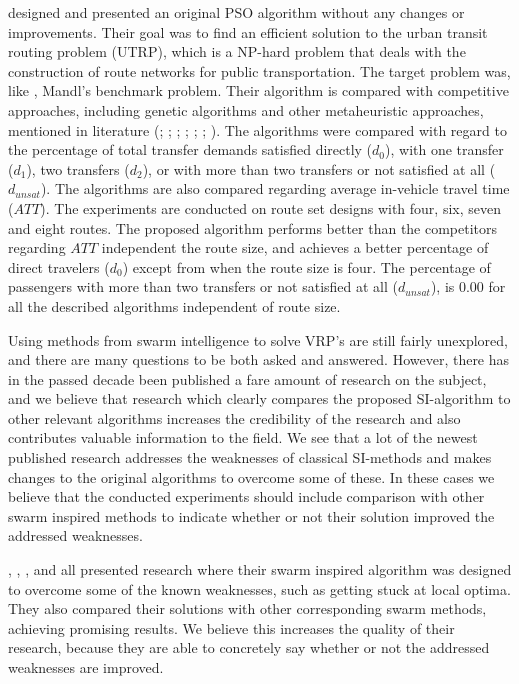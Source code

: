 \citet{kechagiopoulos14} designed and presented an original PSO algorithm without any changes or improvements. Their goal was to find an efficient solution to the urban transit routing problem (UTRP), which is a NP-hard problem that deals with the construction of route networks for public transportation. The target problem was, like \citet{nikolic14}, Mandl's benchmark problem. Their algorithm is compared with competitive approaches, including genetic algorithms and other metaheuristic approaches, mentioned in literature (\citet{baaj91}; \citet{chakroborty02}; \citet{kidwai98}; \citet{fan10}; \citet{fan09-2}; \citet{zhang10}; \citet{chew12}). The algorithms were compared with regard to the percentage of total transfer demands satisfied directly ($d_0$), with one transfer ($d_1$), two transfers ($d_2$), or with more than two transfers or not satisfied at all ($d_{unsat}$). The algorithms are also compared regarding average in-vehicle travel time ($ATT$). The experiments are conducted on route set designs with four, six, seven and eight routes. The proposed algorithm performs better than the competitors regarding $ATT$ independent the route size, and achieves a better percentage of direct travelers ($d_0$) except from when the route size is four. The percentage of passengers with more than two transfers or not satisfied at all ($d_{unsat}$), is $0.00$ for all the described algorithms independent of route size.  \newline

Using methods from swarm intelligence to solve VRP's are still fairly unexplored, and there are many questions to be both asked and answered. However, there has in the passed decade been published a fare amount of research on the subject, and we believe that research which clearly compares the proposed SI-algorithm to other relevant algorithms increases the credibility of the research and also contributes valuable information to the field. We see that a lot of the newest published research addresses the weaknesses of classical SI-methods and makes changes to the original algorithms to overcome some of these. In these cases we believe that the conducted experiments should include comparison with other swarm inspired methods to indicate whether or not their solution improved the addressed weaknesses. 

\citet{tripathi09}, \citet{yang07}, \citet{salehinejad10}, and \citet{jiang10} all presented research where their swarm inspired algorithm was designed to overcome some of the known weaknesses, such as getting stuck at local optima. They also compared their solutions with other corresponding swarm methods, achieving promising results. We believe this increases the quality of their research, because they are able to concretely say whether or not the addressed weaknesses are improved. 

